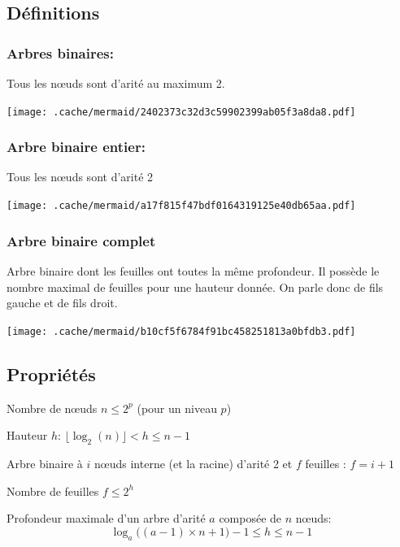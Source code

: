 \hypertarget{duxe9finitions-1}{%
\subsection{Définitions}\label{duxe9finitions-1}}

\hypertarget{arbres-binaires}{%
\subsubsection{Arbres binaires:}\label{arbres-binaires}}

Tous les nœuds sont d'arité au maximum 2.

\texttt{[image: .cache/mermaid/2402373c32d3c59902399ab05f3a8da8.pdf]}

\hypertarget{arbre-binaire-entier}{%
\subsubsection{Arbre binaire entier:}\label{arbre-binaire-entier}}

Tous les nœuds sont d'arité 2

\texttt{[image: .cache/mermaid/a17f815f47bdf0164319125e40db65aa.pdf]}

\hypertarget{arbre-binaire-complet}{%
\subsubsection{Arbre binaire complet}\label{arbre-binaire-complet}}

Arbre binaire dont les feuilles ont toutes la même profondeur. Il
possède le nombre maximal de feuilles pour une hauteur donnée. On parle
donc de fils gauche et de fils droit.

\texttt{[image: .cache/mermaid/b10cf5f6784f91bc458251813a0bfdb3.pdf]}

\hypertarget{propriuxe9tuxe9s}{%
\subsection{Propriétés}\label{propriuxe9tuxe9s}}

Nombre de nœuds \(n \leqslant 2^p\) (pour un niveau \(p\))

Hauteur \(h\): \(\lfloor \log_2(n) \rfloor < h \leqslant n - 1\)

Arbre binaire à \(i\) nœuds interne (et la racine) d'arité 2 et \(f\)
feuilles : \(f = i + 1\)

Nombre de feuilles \(f \leqslant 2^h\)

Profondeur maximale d'un arbre d'arité \(a\) composée de \(n\) nœuds:
\[\log_a\big((a-1)\times n + 1\big) - 1 \leqslant h \leqslant n-1\]

